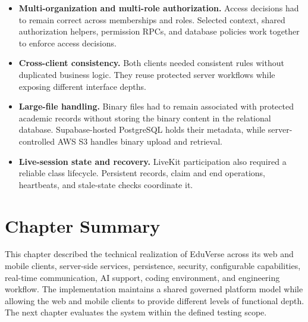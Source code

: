 \begin{itemize}
  \item \textbf{Multi-organization and multi-role authorization.} Access
    decisions had to remain correct across memberships and roles. Selected
    context, shared authorization helpers, permission RPCs, and database
    policies work together to enforce access decisions.
  \item \textbf{Cross-client consistency.} Both clients needed consistent rules
    without duplicated business logic. They reuse protected server workflows
    while exposing different interface depths.
  \item \textbf{Large-file handling.} Binary files had to remain associated
    with protected academic records without storing the binary content in the
    relational database. Supabase-hosted PostgreSQL holds their metadata, while
    server-controlled AWS S3 handles binary upload and retrieval.
  \item \textbf{Live-session state and recovery.} LiveKit participation also
    required a reliable class lifecycle. Persistent records, claim and end
    operations, heartbeats, and stale-state checks coordinate it.
\end{itemize}

\section{Chapter Summary}\label{sec:implementation_chapter_summary}

This chapter described the technical realization of EduVerse across its web and
mobile clients, server-side services, persistence, security, configurable
capabilities, real-time communication, AI support, coding environment, and
engineering workflow. The implementation maintains a shared governed platform
model while allowing the web and mobile clients to provide different levels of
functional depth. The next chapter evaluates the system within the defined
testing scope.

